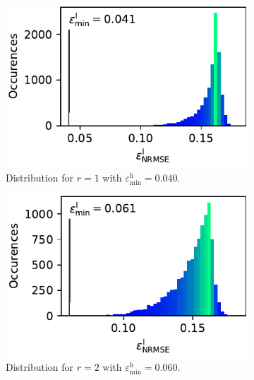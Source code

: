 \documentclass[
  a4paper,  %
  twoside,  %
  bibliography=totoc,
  headsepline,
  cleardoublepage=empty,
  parskip=half,
  draft=false
]{scrbook}
\begin{document}
\begin{mdframed}[style=style]
\begin{figure}[H]
  \centering
    \begin{subfigure}{.5\textwidth}
  \centering
   \includegraphics[width=0.95\linewidth]{graphics/ww_hist_1}
  \caption{Distribution for $r=1$ with $\varepsilon^\mathrm{h}_{\mathrm{min}}=0.040$.}
\vspace{3mm}
\label{fig:ishigami_hist_1}
\end{subfigure}%
\begin{subfigure}{.5\textwidth}
  \centering
   \includegraphics[width=0.95\linewidth]{graphics/ww_hist_2}
  \caption{Distribution for $r=2$ with $\varepsilon^\mathrm{h}_{\mathrm{min}}=0.060$.}
\vspace{3mm}
\label{fig:ishigami_hist_2}
\end{subfigure}%
\vspace{3mm}
  \begin{subfigure}{.5\textwidth}

\end{subfigure}
\end{figure}
\end{mdframed}
\end{document}
